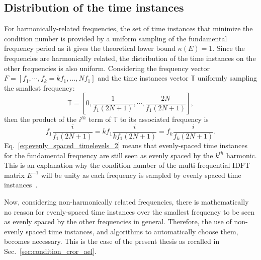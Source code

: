 \subsection{Distribution of the time instances}
For harmonically-related frequencies, the set of time instances
that minimize the condition number is 
provided by a uniform sampling of the fundamental frequency period
as it gives the theoretical lower bound $\kappa (E) = 1$. Since the
frequencies are harmonically related, the distribution of the time
instances on the other frequencies is also uniform. Considering the
frequency vector $F = \left[f_1, \cdots,f_k= kf_1,\ldots,Nf_1 \right]$
and the time instances vector
$\mathbb{T}$ uniformly sampling the smallest frequency:
\begin{equation}
  \mathbb{T} = \left[0, \frac{1}{f_1 (2N+1)}, \cdots,  \frac{2N}{f_1 (2N+1)} \right],
  \label{eq:evenly_spaced_timelevels}
\end{equation}
then the product of the $i^{th}$ term of $\mathbb{T}$ to its
associated frequency is
\begin{equation}
  f_1 \frac{i}{f_1 (2N+1)} = k f_1 \frac{i}{k f_1 (2N+1)} = f_k \frac{i}{f_k (2N+1)}.
  \label{eq:evenly_spaced_timelevels_2}
\end{equation}
Eq.~\eqref{eq:evenly_spaced_timelevels_2} means that evenly-spaced
time instances for the fundamental frequency are still seen as evenly
spaced by the $k^{th}$ harmonic. This is an explanation why the
condition number of the multi-frequential IDFT matrix $E^{-1}$ will be
unity as each frequency is sampled by evenly spaced time
instances~\cite{Brambilla1999}.

Now, considering non-harmonically related frequencies, there is
mathematically no reason for evenly-spaced time instances over the
smallest frequency to be seen as evenly spaced by the other frequencies
in general. Therefore, the use of non-evenly spaced time instances,
and algorithms to automatically choose them, becomes necessary. This
is the case of the present thesis as recalled in Sec.~\ref{sec:condition_cror_ael}.

